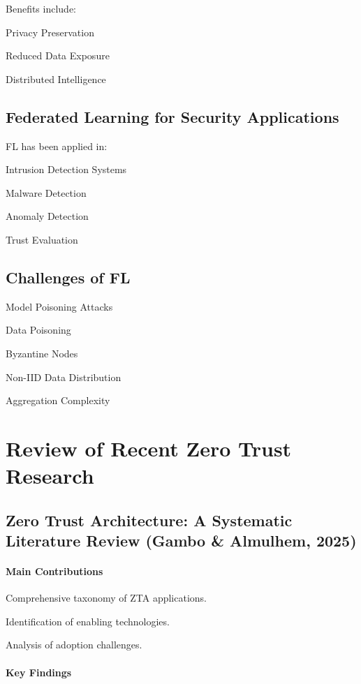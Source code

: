 Benefits include:


Privacy Preservation


Reduced Data Exposure


Distributed Intelligence


\subsection{Federated Learning for Security Applications}

FL has been applied in:


Intrusion Detection Systems


Malware Detection


Anomaly Detection


Trust Evaluation


\subsection{Challenges of FL}

Model Poisoning Attacks


Data Poisoning


Byzantine Nodes


Non-IID Data Distribution


Aggregation Complexity


\section{Review of Recent Zero Trust Research}

\subsection{Zero Trust Architecture: A Systematic Literature Review (Gambo \& Almulhem, 2025)}

\paragraph{Main Contributions}

Comprehensive taxonomy of ZTA applications.


Identification of enabling technologies.


Analysis of adoption challenges.


\paragraph{Key Findings}

